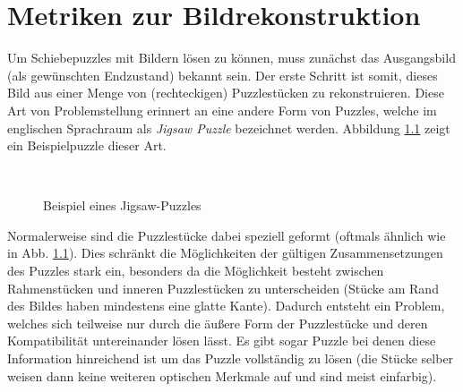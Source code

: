 \documentclass{whswinvcbook}
\begin{document}
\chapter{Metriken zur Bildrekonstruktion}\label{ch-metrics}
Um Schiebepuzzles mit Bildern lösen zu können, muss zunächst das Ausgangsbild (als gewünschten Endzustand) bekannt sein. Der erste Schritt ist somit, dieses Bild aus einer Menge von (rechteckigen) Puzzlestücken zu rekonstruieren. Diese Art von Problemstellung erinnert an eine andere Form von Puzzles, welche im englischen Sprachraum als \textit{Jigsaw Puzzle} bezeichnet werden. Abbildung \ref{fig-jig-ex} zeigt ein Beispielpuzzle dieser Art.
\begin{figure}[H]
    \centering
    \\
    \quad
    \caption{Beispiel eines Jigsaw-Puzzles}
    \label{fig-jig-ex}
\end{figure}
Normalerweise sind die Puzzlestücke dabei speziell geformt (oftmals ähnlich wie in Abb. \ref{fig-jig-ex}). Dies schränkt die Möglichkeiten der gültigen Zusammensetzungen des Puzzles stark ein, besonders da die Möglichkeit besteht zwischen Rahmenstücken und inneren Puzzlestücken zu unterscheiden (Stücke am Rand des Bildes haben mindestens eine glatte Kante). Dadurch entsteht ein Problem, welches sich teilweise nur durch die äußere Form der Puzzlestücke und deren Kompatibilität untereinander lösen lässt. Es gibt sogar Puzzle bei denen diese Information hinreichend ist um das Puzzle vollständig zu lösen (die Stücke selber weisen dann keine weiteren optischen Merkmale auf und sind meist einfarbig).
\end{document}
